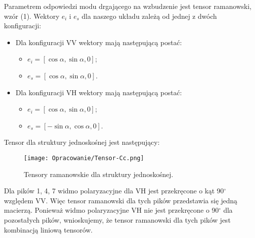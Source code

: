 Parametrem odpowiedzi modu drgającego na wzbudzenie jest tensor ramanowski, wzór (1). Wektory $e_{i}$ i $e_{s}$ dla naszego układu zależą od jednej z dwóch konfiguracji:
\begin{itemize}
	\item Dla konfiguracji VV wektory mają następującą postać:
	\begin{itemize}
		\item $e_{i} = [\cos \alpha, \sin \alpha, 0]$;
		\item $e_{s} = [\cos \alpha, \sin \alpha, 0]$.
	\end{itemize}
	\item Dla konfiguracji VH wektory mają następującą postać:
	\begin{itemize}
		\item $e_{i} = [\cos \alpha, \sin \alpha, 0]$;
		\item $e_{s} = [-\sin \alpha, \cos \alpha, 0]$.
	\end{itemize}
\end{itemize}

Tensor dla struktury jednoskośnej jest następujący:

\begin{figure}[H]
	\begin{center}
		\texttt{[image: Opracowanie/Tensor-Cc.png]}
		\caption{Tensory ramanowskie dla struktury jednoskośnej.}
	\end{center}
\end{figure}

Dla pików 1, 4, 7 widmo polaryzacyjne dla VH jest przekręcone o kąt 90$^{\circ}$ względem VV. Więc tensor ramanowski dla tych pików przedstawia się jedną macierzą. Ponieważ widmo polaryzacyjne VH nie jest przekręcone o 90$^{\circ}$ dla pozostałych pików, wnioskujemy, że tensor ramanowski dla tych pików jest kombinacją liniową tensorów. 



